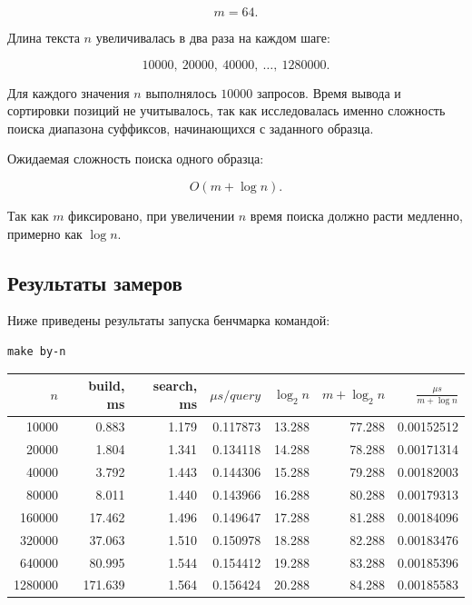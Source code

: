 \[
m = 64.
\]

Длина текста \(n\) увеличивалась в два раза на каждом шаге:

\[
10000,\ 20000,\ 40000,\ \ldots,\ 1280000.
\]

Для каждого значения \(n\) выполнялось \(10000\) запросов. 
Время вывода и сортировки позиций не учитывалось, так как исследовалась именно сложность поиска диапазона суффиксов, начинающихся с заданного образца.

Ожидаемая сложность поиска одного образца:

\[
O(m + \log n).
\]

Так как \(m\) фиксировано, при увеличении \(n\) время поиска должно расти медленно, примерно как \(\log n\).

\subsection{Результаты замеров}

Ниже приведены результаты запуска бенчмарка командой:

\begin{verbatim}
make by-n
\end{verbatim}

\begin{center}
\begin{tabular}{|r|r|r|r|r|r|r|}
\hline
\textbf{\(n\)} & 
\textbf{build, ms} & 
\textbf{search, ms} & 
\textbf{\(\mu s/query\)} & 
\textbf{\(\log_2 n\)} & 
\textbf{\(m + \log_2 n\)} & 
\textbf{\(\frac{\mu s}{m+\log n}\)} \\ \hline

10000   & 0.883   & 1.179 & 0.117873 & 13.288 & 77.288 & 0.00152512 \\ \hline
20000   & 1.804   & 1.341 & 0.134118 & 14.288 & 78.288 & 0.00171314 \\ \hline
40000   & 3.792   & 1.443 & 0.144306 & 15.288 & 79.288 & 0.00182003 \\ \hline
80000   & 8.011   & 1.440 & 0.143966 & 16.288 & 80.288 & 0.00179313 \\ \hline
160000  & 17.462  & 1.496 & 0.149647 & 17.288 & 81.288 & 0.00184096 \\ \hline
320000  & 37.063  & 1.510 & 0.150978 & 18.288 & 82.288 & 0.00183476 \\ \hline
640000  & 80.995  & 1.544 & 0.154412 & 19.288 & 83.288 & 0.00185396 \\ \hline
1280000 & 171.639 & 1.564 & 0.156424 & 20.288 & 84.288 & 0.00185583 \\ \hline
\end{tabular}
\end{center}

